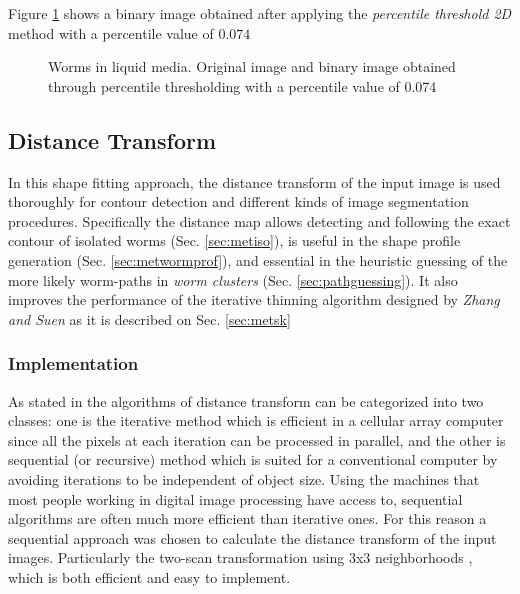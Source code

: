 Figure \ref{fig:wormthres} shows a binary image obtained after applying
the \emph{percentile threshold 2D} method with a percentile value of $0.074$

\begin{figure}[h t b p ! H]
  \centering
\qquad
\caption{Worms in liquid media. Original image and binary image obtained through
percentile thresholding with a percentile value of 0.074}
  \label{fig:wormthres}
\end{figure}

\subsection{Distance Transform}
\label{sec:metdt}

In this shape fitting approach, the distance transform
of the input image is used thoroughly for contour detection and different kinds of image 
segmentation procedures. Specifically the distance map allows detecting and following
the exact contour of isolated worms (Sec. \ref{sec:metiso}), 
is useful in the shape profile generation (Sec. \ref{sec:metwormprof}), and essential in the heuristic
guessing of the more likely worm-paths in \emph{worm clusters} 
(Sec. \ref{sec:pathguessing}).
It also improves the performance of the iterative thinning algorithm designed by 
\emph{Zhang and Suen} \cite{thinning} as it is described on Sec. \ref{sec:metsk}

\subsubsection{Implementation}
\label{sec:dtimp}

 As stated in \cite[p.196]{fastdt} the algorithms of distance transform can be categorized into two classes: one is the iterative 
 method which is efficient in a cellular array computer since all the pixels at each iteration can be processed in parallel, and the other 
is sequential (or recursive) method which is suited for a conventional computer by
 avoiding iterations to be independent of object size. 
Using the machines that most people working in digital image processing
 have access to, sequential algorithms are often much more efficient than
 iterative ones. For this reason a sequential approach was chosen to calculate the
distance transform of the input images. Particularly the two-scan transformation
using 3x3 neighborhoods \cite{fastdt}, which is both efficient and easy to implement.\\

